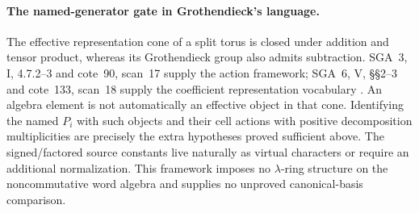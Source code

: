 \paragraph{The named-generator gate in Grothendieck's language.}
The effective representation cone of a split torus is
closed under addition and tensor product, whereas its
Grothendieck group also admits subtraction.
SGA~3, I, 4.7.2--3 and cote~90, scan~17 supply the
action framework; SGA~6, V, \S\S2--3 and cote~133,
scan~18 supply the coefficient representation
vocabulary \cite{SGA3,SGA6,Archive}.
An algebra element is not automatically an effective
object in that cone. Identifying the named \(P_i\)
with such objects and their cell actions with positive
decomposition multiplicities are precisely the extra
hypotheses proved sufficient above.
The signed/factored source constants live naturally
as virtual characters or require an additional
normalization. This framework imposes no
\(\lambda\)-ring structure on the noncommutative word
algebra and supplies no unproved canonical-basis
comparison.
